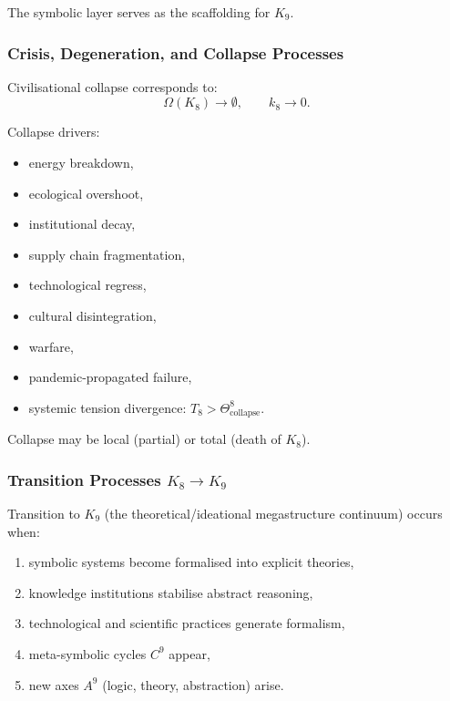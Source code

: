 The symbolic layer serves as the scaffolding for $K_9$.

\subsubsection{Crisis, Degeneration, and Collapse Processes}

Civilisational collapse corresponds to:
\[
\Omega(K_8) \to \emptyset,
\qquad
k_8 \to 0.
\]

Collapse drivers:
\begin{itemize}
    \item energy breakdown,
    \item ecological overshoot,
    \item institutional decay,
    \item supply chain fragmentation,
    \item technological regress,
    \item cultural disintegration,
    \item warfare,
    \item pandemic-propagated failure,
    \item systemic tension divergence: $T_8 > \Theta^8_{\text{collapse}}$.
\end{itemize}

Collapse may be local (partial) or total (death of $K_8$).

\subsubsection{Transition Processes \texorpdfstring{$K_8 \to K_9$}{K_8 \to K_9}}

Transition to $K_9$ (the theoretical/ideational megastructure continuum)
occurs when:

\begin{enumerate}
    \item symbolic systems become formalised into explicit theories,
    \item knowledge institutions stabilise abstract reasoning,
    \item technological and scientific practices generate formalism,
    \item meta-symbolic cycles $C^9$ appear,
    \item new axes $A^9$ (logic, theory, abstraction) arise.
\end{enumerate}

